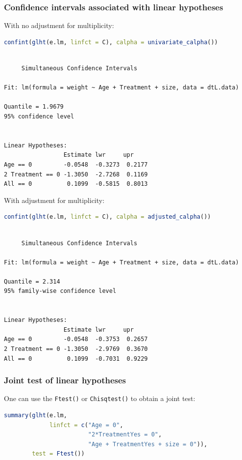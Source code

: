 \documentclass{article}
\begin{document}
\subsubsection{Confidence intervals associated with linear hypotheses}
\label{sec:orga96c103}

With no adjustment for multiplicity:
\begin{lstlisting}[language=r,numbers=none]
confint(glht(e.lm, linfct = C), calpha = univariate_calpha())
\end{lstlisting}

\label{}
\begin{verbatim}

	 Simultaneous Confidence Intervals

Fit: lm(formula = weight ~ Age + Treatment + size, data = dtL.data)

Quantile = 1.9679
95% confidence level
 

Linear Hypotheses:
                 Estimate lwr     upr    
Age == 0         -0.0548  -0.3273  0.2177
2 Treatment == 0 -1.3050  -2.7268  0.1169
All == 0          0.1099  -0.5815  0.8013
\end{verbatim}

With adjustment for multiplicity:
\begin{lstlisting}[language=r,numbers=none]
confint(glht(e.lm, linfct = C), calpha = adjusted_calpha())
\end{lstlisting}

\label{}
\begin{verbatim}

	 Simultaneous Confidence Intervals

Fit: lm(formula = weight ~ Age + Treatment + size, data = dtL.data)

Quantile = 2.314
95% family-wise confidence level
 

Linear Hypotheses:
                 Estimate lwr     upr    
Age == 0         -0.0548  -0.3753  0.2657
2 Treatment == 0 -1.3050  -2.9769  0.3670
All == 0          0.1099  -0.7031  0.9229
\end{verbatim}
\subsubsection{Joint test of linear hypotheses}
\label{sec:org141e027}

One can use the \texttt{Ftest()} or \texttt{Chisqtest()} to obtain a joint test:
\begin{lstlisting}[language=r,numbers=none]
summary(glht(e.lm, 
             linfct = c("Age = 0",
                        "2*TreatmentYes = 0",
                        "Age + TreatmentYes + size = 0")), 
        test = Ftest())
\end{lstlisting}
\end{document}
